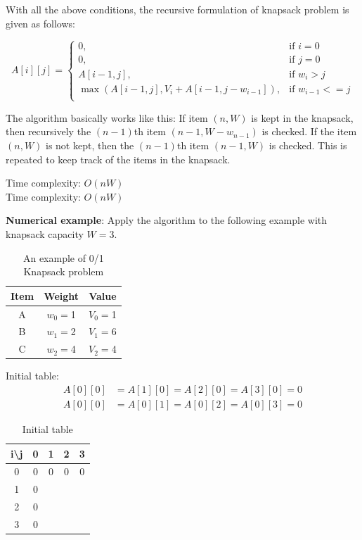 \documentclass[a4paper,11pt]{book}
\begin{document}
\noindent With all the above conditions, the recursive formulation of knapsack problem is given as follows:

\[
    A[i][j]= 
\begin{cases}
    0, & \text{if } i=0\\
    0, & \text{if } j=0\\
    A[i-1,j], & \text{if } w_i > j\\
    \max(A[i-1,j], V_i + A[i-1,j-w_{i-1}]), & \text{if } w_{i-1} <= j\\
\end{cases}
\]

\noindent The algorithm basically works like this: If item $(n,W)$ is kept in the knapsack, then recursively the $(n-1)$th item $(n-1, W-w_{n-1})$ is checked. If the item $(n,W)$ is not kept, then the $(n-1)$th item $(n-1, W)$ is checked. This is repeated to keep track of the items in the knapsack.

\vspace{5mm}

\noindent Time complexity: $O(nW)$\\
\noindent \noindent Time complexity: $O(nW)$

\vspace{3mm}

\noindent \textbf{Numerical example}: Apply the algorithm to the following example with knapsack capacity $W=3$.
\begin{table}[ht]
\centering
\begin{tabular}{|c|c|c|}
\hline
Item & Weight & Value \\ \hline
A    & $w_0=$1      & $V_0=$1     \\
B    & $w_1=$2      & $V_1=$6     \\
C    & $w_2=$4      & $V_2=$4 \\
\hline
\end{tabular}
\caption{An example of 0/1 Knapsack problem}
\end{table}

\noindent Initial table:
\begin{align*}
    A[0][0] &= A[1][0] = A[2][0] = A[3][0] = 0\\
    A[0][0] &= A[0][1] = A[0][2] = A[0][3] = 0
\end{align*}

\begin{table}[ht]
\centering
\begin{tabular}{|c|c|c|c|c|}
\hline
i\textbackslash{}j & 0 & 1 & 2 & 3 \\ \hline
0                  & 0 & 0 & 0 & 0 \\ \hline
1                  & 0 &   &   &   \\ \hline
2                  & 0 &   &   &   \\ \hline
3                  & 0 &   &   &   \\ \hline
\end{tabular}
\caption{Initial table}
\end{table}
\end{document}
